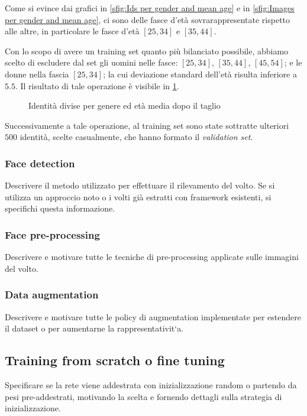 Come si evince dai grafici in \ref{sfig:Ids per gender and mean age} e in \ref{sfig:Images per gender and mean age}, ci sono delle fasce d'età sovrarappresentate rispetto alle altre, in particolare le fasce d'età $[25,34]$ e $[35,44]$.

Con lo scopo di avere un training set quanto più bilanciato possibile, abbiamo scelto di escludere dal set gli uomini nelle fasce: $[25,34]$, $[35,44]$, $[45,54]$; e le donne nella fascia $[25,34]$; la cui deviazione standard dell'età risulta inferiore a $5.5$. Il risultato di tale operazione è visibile in \cref{fig:Ids per gender and mean age after the drop}.

\begin{figure}[H]
\centering
\def\svgscale{0.7}

\caption{Identità divise per genere ed età media dopo il taglio}
\label{fig:Ids per gender and mean age after the drop}
\end{figure}

Successivamente a tale operazione, al training set sono state sottratte ulteriori $500$ identità, scelte casualmente, che hanno formato il \emph{validation set}.

\subsubsection{Face detection} 
Descrivere il metodo utilizzato per effettuare il rilevamento del volto. Se si utilizza un approccio noto o i volti già estratti con framework esistenti, si specifichi questa informazione.

\subsubsection{Face pre-processing} 
Descrivere e motivare tutte le tecniche di pre-processing applicate sulle immagini del volto.

\subsubsection{Data augmentation}
Descrivere e motivare tutte le policy di augmentation
implementate per estendere il dataset o per aumentarne la rappresentativit`a.

\subsection{Training from scratch o fine tuning}
Specificare se la rete viene addestrata
con inizializzazione random o partendo da pesi pre-addestrati, motivando la
scelta e fornendo dettagli sulla strategia di inizializzazione.

